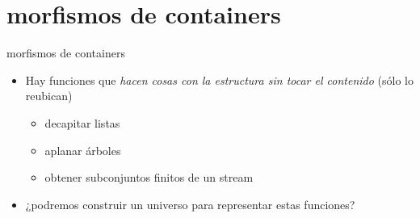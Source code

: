 \documentclass[9pt]{beamer}
\newcommand{\saltar}{\vspace{1ex}}
\begin{document}
\section{morfismos de containers}
\begin{frame}[fragile]{morfismos de containers}
  \vspace{3ex}
    \begin{itemize}
    \item Hay funciones que \emph{hacen cosas con la estructura sin tocar el contenido} (\alert{sólo lo reubican})
      \begin{itemize}
      \item decapitar listas
      \item aplanar árboles
      \item obtener subconjuntos finitos de un stream
      \end{itemize}\saltar
  \item ¿podremos construir un universo para representar estas funciones?
  \end{itemize}
\end{frame}
\end{document}
